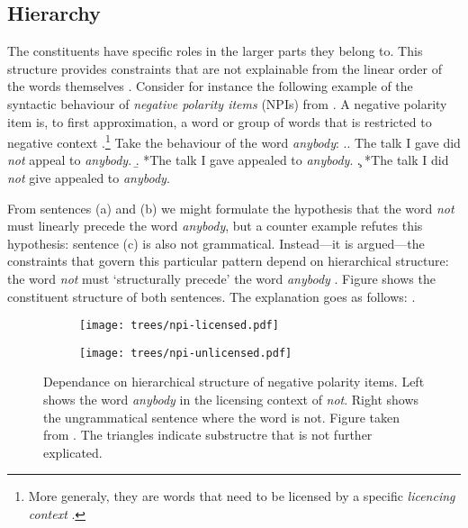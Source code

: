 \subsection{Hierarchy}
The constituents have specific roles in the larger parts they belong to. This structure provides constraints that are not explainable from the linear order of the words themselves \citep{everaert2015structures}. Consider for instance the following example of the syntactic behaviour of \textit{negative polarity items} (NPIs) from \citet{everaert2015structures}. A negative polarity item is, to first approximation, a word or group of words that is restricted to negative context \citep{everaert2015structures}.\footnote{More generaly, they are words that need to be licensed by a specific \textit{licencing context} \citep{giannakidou2011npi}.} Take the behaviour of the word \textit{anybody}:
\exi.\a. The talk I gave did \textit{not} appeal to \textit{anybody}.
     \b. *The talk I gave appealed to \textit{anybody}.
     \c. *The talk I did \textit{not} give appealed to \textit{anybody}.

From sentences (a) and (b) we might formulate the hypothesis that the word \textit{not} must linearly precede the word \textit{anybody}, but a counter example refutes this hypothesis: sentence (c) is also not grammatical. Instead---it is argued---the constraints that govern this particular pattern depend on hierarchical structure: the word \textit{not} must `structurally precede' the word \textit{anybody} \citep{everaert2015structures}. Figure \label{ref:trees-npi} shows the constituent structure of both sentences. The explanation goes as follows:  \citep{everaert2015structures}.

\begin{figure}[h]
  \center
  \begin{subfigure}[b]{0.5\textwidth}
		\texttt{[image: trees/npi-licensed.pdf]}
	\end{subfigure}
	\begin{subfigure}[b]{0.45\textwidth}
		\texttt{[image: trees/npi-unlicensed.pdf]}
	\end{subfigure}
\caption{Dependance on hierarchical structure of negative polarity items. Left shows the word \textit{anybody} in the licensing context of \textit{not}. Right shows the ungrammatical sentence where the word is not. Figure taken from \cite{everaert2015structures}. The triangles indicate substructre that is not further explicated.}
\label{fig:trees-npi}
\end{figure}


